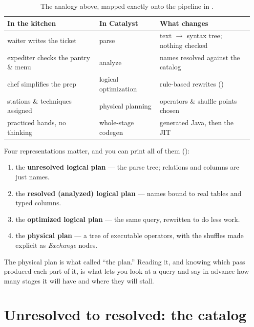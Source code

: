 \begin{table}[H]
\centering\footnotesize
\renewcommand{\arraystretch}{1.2}
\begin{tabular}{@{}P{4.4cm}P{3.6cm}P{6cm}@{}}
\toprule
\textbf{In the kitchen} & \textbf{In Catalyst} & \textbf{What changes} \\
\midrule
waiter writes the ticket & parse & text $\to$ syntax tree; nothing checked \\
expediter checks the pantry \& menu & analyze & names resolved against the catalog \\
chef simplifies the prep & logical optimization & rule-based rewrites () \\
stations \& techniques assigned & physical planning & operators \& shuffle points chosen \\
practiced hands, no thinking & whole-stage codegen & generated Java, then the JIT \\
\bottomrule
\end{tabular}
\caption{The analogy above, mapped exactly onto the pipeline in .}
\end{table}

Four representations matter, and you can print all of them ():

\begin{enumerate}
  \item the \textbf{unresolved logical plan} --- the parse tree; relations and
        columns are just names.
  \item the \textbf{resolved (analyzed) logical plan} --- names bound to real
        tables and typed columns.
  \item the \textbf{optimized logical plan} --- the same query, rewritten to do
        less work.
  \item the \textbf{physical plan} --- a tree of executable operators, with the
        shuffles made explicit as \emph{Exchange} nodes.
\end{enumerate}

The physical plan is what  called ``the plan.'' Reading it, and
knowing which pass produced each part of it, is what lets you look at a query and
say in advance how many stages it will have and where they will stall.

\section{Unresolved to resolved: the catalog}
\label{sec:catalyst-analysis}

